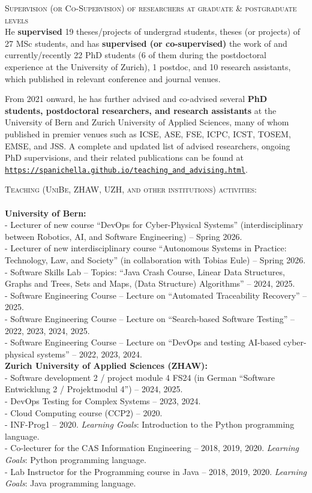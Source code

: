 \documentclass[11pt]{article}
\providecommand*\url[1]{\href{#1}{#1}}
\renewcommand*\url[1]{\href{#1}{\texttt{#1}}}
\begin{document}
 
\medskip \medskip
\textsc{Supervision (or Co-Supervision) of researchers at graduate \& postgraduate levels}
\medskip \\
He \textbf{supervised} 19 theses/projects of undergrad students, theses (or projects) of 27 MSc students, and has \textbf{supervised (or co-supervised)} the work of and currently/recently 22 PhD students (6 of them during the postdoctoral experience at the University of Zurich), 1 postdoc, and 10 research assistants, which published in relevant conference and journal venues. 

From 2021 onward, he has further advised and co-advised several \textbf{PhD students, postdoctoral researchers, and research assistants} at the University of Bern and Zurich University of Applied Sciences, many of whom published in premier venues such as ICSE, ASE, FSE, ICPC, ICST, TOSEM, EMSE, and JSS. A complete and updated list of advised researchers, ongoing PhD supervisions, and their related publications can be found at
\url{https://spanichella.github.io/teaching\_and\_advising.html}.

\textsc{Teaching (UniBe, ZHAW, UZH, and other institutions) activities:}
 \\
\\
\textbf{University of Bern:}
\medskip \\
- Lecturer of new course ``DevOps for Cyber-Physical Systems'' (interdisciplinary between Robotics, AI, and Software Engineering) –  Spring 2026.\\
- Lecturer of new interdisciplinary course ``Autonomous Systems in Practice: Technology, Law, and Society'' (in collaboration with Tobias Eule) –  Spring 2026.\\
- Software Skills Lab – Topics: ``Java Crash Course, Linear Data Structures, Graphs and Trees, Sets and Maps, (Data Structure) Algorithms'' – 2024, 2025.\\
- Software Engineering Course – Lecture on ``Automated Traceability Recovery'' – 2025.\\
- Software Engineering Course – Lecture on ``Search-based Software Testing'' – 2022, 2023, 2024, 2025.\\
- Software Engineering Course – Lecture on ``DevOps and testing AI-based cyber-physical systems'' – 2022, 2023, 2024.\\
 

\textbf{Zurich University of Applied Sciences (ZHAW):}
\medskip \\
- Software development 2 / project module 4 FS24 (in German ``Software Entwicklung 2 / Projektmodul 4'') – 2024, 2025.\\
- DevOps Testing for Complex Systems – 2023, 2024.\\
- Cloud Computing course (CCP2) – 2020.\\
- INF-Prog1 – 2020. \textit{Learning Goals}: Introduction to the Python programming language.\\
- Co-lecturer for the CAS Information Engineering – 2018, 2019, 2020. \textit{Learning Goals}: Python programming language.\\
- Lab Instructor for the Programming course in Java – 2018, 2019, 2020. \textit{Learning Goals}: Java programming language.\\
\end{document}

